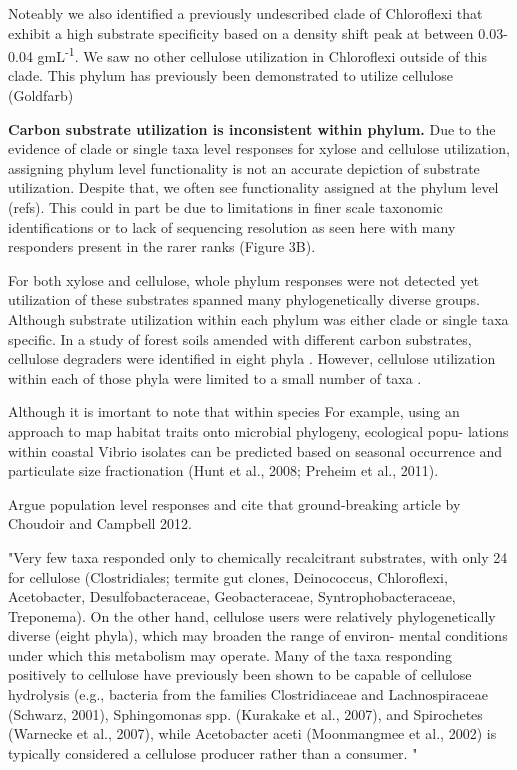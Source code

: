 Noteably we also identified a previously undescribed clade of Chloroflexi that exhibit a high substrate specificity based on a density shift peak at between 0.03-0.04 gmL\textsuperscript{-1}.  We saw no other cellulose utilization in Chloroflexi outside of this clade.  This phylum has previously been demonstrated to utilize cellulose (Goldfarb)  

\textbf{Carbon substrate utilization is inconsistent within phylum.} Due to the evidence of clade or single taxa level responses for xylose and cellulose utilization, assigning phylum level functionality is not an accurate depiction of substrate utilization. Despite that, we often see functionality assigned at the phylum level (refs). This could in part be due to limitations in finer scale taxonomic identifications or to lack of sequencing resolution as seen here with many responders present in the rarer ranks (Figure 3B). 

For both xylose and cellulose, whole phylum responses were not detected yet utilization of these substrates spanned many phylogenetically diverse groups.  Although substrate utilization within each phylum was either clade or single taxa specific.  In a study of forest soils amended with different carbon substrates, cellulose degraders were identified in eight phyla \cite{Goldfarb_2011}. However, cellulose utilization within each of those phyla were limited to a small number of taxa \cite{Goldfarb_2011}.      

Although it is imortant to note that within species 
For example, using an approach to map habitat traits onto microbial phylogeny, ecological popu- lations within coastal Vibrio isolates can be predicted based on seasonal occurrence and particulate size fractionation (Hunt et al., 2008; Preheim et al., 2011).


Argue population level responses and cite that ground-breaking article by Choudoir and Campbell 2012.  
   
   "Very few taxa responded only to chemically recalcitrant substrates, with only 24 for cellulose (Clostridiales; termite gut clones, Deinococcus, Chloroflexi, Acetobacter, Desulfobacteraceae, Geobacteraceae, Syntrophobacteraceae, Treponema). On the other hand, cellulose users were relatively phylogenetically diverse (eight phyla), which may broaden the range of environ- mental conditions under which this metabolism may operate. Many of the taxa responding positively to cellulose have previously been shown to be capable of cellulose hydrolysis (e.g., bacteria from the families Clostridiaceae and Lachnospiraceae (Schwarz, 2001), Sphingomonas spp. (Kurakake et al., 2007), and Spirochetes (Warnecke et al., 2007), while Acetobacter aceti (Moonmangmee et al., 2002) is typically considered a cellulose producer rather than a consumer. "\cite{Goldfarb_2011}

